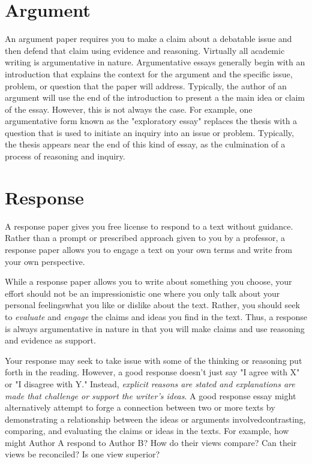 \hypertarget{argument}{} \section{Argument}

An argument paper requires you to make a claim about a debatable issue and then
defend that claim using evidence and reasoning. Virtually all academic writing
is argumentative in nature. Argumentative essays generally begin with an introduction
that explains the context for the argument and the specific issue, problem, or
question that the paper will address. Typically, the author of an argument will
use the end of the introduction to present a \textemdash the main
idea or claim of the essay. However, this is not always the case. For example,
one argumentative form known as the "exploratory essay" replaces the thesis with a
question that is used to initiate an inquiry into an issue or problem. Typically, the
thesis appears near the end of this kind of essay, as the culmination of a process
of reasoning and inquiry.


\hypertarget{responseessay}{} \section{Response}

A response paper gives you free license to respond to a text without guidance.
Rather than a prompt or prescribed approach given to you by a professor, a
response paper allows you to engage a text on your own terms and write from your
own perspective.

While a response paper allows you to write about something you choose, your
effort should not be an impressionistic one where you only talk about your
personal feelings\textemdash what you like or dislike about the text. Rather,
you should seek to \emph{evaluate} and \emph{engage} the claims and ideas you
find in the text. Thus, a response is always argumentative in nature in that you will make 
claims and use reasoning and evidence as support.

Your response may seek to take issue with some of the thinking or reasoning put
forth in the reading. However, a good response doesn't just say "I agree with X"
or "I disagree with Y." Instead, \emph{explicit reasons are stated and
explanations are made that challenge or support the writer's ideas}. A good
response essay might alternatively attempt to forge a connection between two or
more texts by demonstrating a relationship between the ideas or arguments
involved\textemdash contrasting, comparing, and evaluating the claims or ideas
in the texts. For example, how might Author A respond to Author B? How
do their views compare? Can their views be reconciled? Is one view superior?

